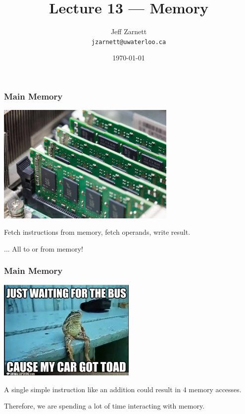 

\title{Lecture 13 --- Memory }

\author{Jeff Zarnett \\ \small \texttt{jzarnett@uwaterloo.ca}}
\date{\today}




\begin{frame}
  \titlepage

 \end{frame}


\begin{frame}
\frametitle{Main Memory}

\begin{center}
	\includegraphics[width=0.65\textwidth]{images/ram.jpg}
\end{center}

Fetch instructions from memory, fetch operands, write result.

... All to or from memory!

 \end{frame}


\begin{frame}
\frametitle{Main Memory}

\begin{center}
	\includegraphics[width=0.5\textwidth]{images/waiting-for-the-bus.jpg}
\end{center}

A single simple instruction like an addition could result in 4 memory accesses. 

Therefore, we are spending a lot of time interacting with memory.


\end{frame}

